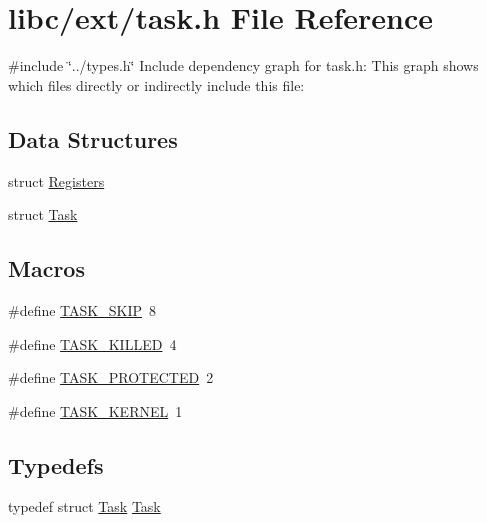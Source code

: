 \hypertarget{a00059}{}\section{libc/ext/task.h File Reference}
\label{a00059}
{\ttfamily \#include \char`\"{}../types.\+h\char`\"{}}\newline
Include dependency graph for task.\+h\+:
This graph shows which files directly or indirectly include this file\+:
\subsection*{Data Structures}
\begin{DoxyCompactItemize}
\item 
struct \hyperlink{a00147}{Registers}
\item 
struct \hyperlink{a00151}{Task}
\end{DoxyCompactItemize}
\subsection*{Macros}
\begin{DoxyCompactItemize}
\item 
\#define \hyperlink{a00059_a74e226c76efbb6f22c9578b06dfb1bc5_a74e226c76efbb6f22c9578b06dfb1bc5}{T\+A\+S\+K\+\_\+\+S\+K\+IP}~8
\item 
\#define \hyperlink{a00059_a08b194bba7eb50323bcf424f07be67c8_a08b194bba7eb50323bcf424f07be67c8}{T\+A\+S\+K\+\_\+\+K\+I\+L\+L\+ED}~4
\item 
\#define \hyperlink{a00059_a4a5cf4cf0c94e422fdede942ba9bafb2_a4a5cf4cf0c94e422fdede942ba9bafb2}{T\+A\+S\+K\+\_\+\+P\+R\+O\+T\+E\+C\+T\+ED}~2
\item 
\#define \hyperlink{a00059_a99096319a92bcf092a1a00a701afbfd8_a99096319a92bcf092a1a00a701afbfd8}{T\+A\+S\+K\+\_\+\+K\+E\+R\+N\+EL}~1
\end{DoxyCompactItemize}
\subsection*{Typedefs}
\begin{DoxyCompactItemize}
\item 
typedef struct \hyperlink{a00151}{Task} \hyperlink{a00059_a7a90fbdcc84682f027affec67944111b_a7a90fbdcc84682f027affec67944111b}{Task}
\end{DoxyCompactItemize}
